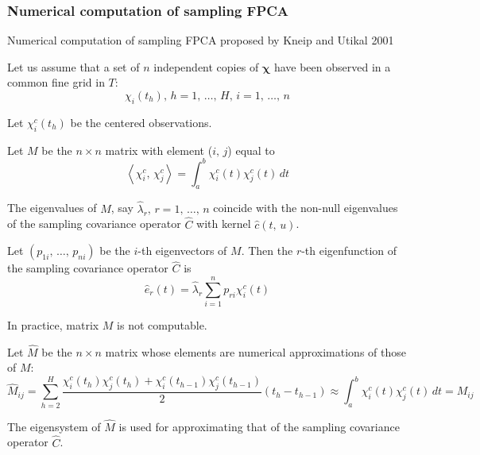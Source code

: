 \subsubsection{Numerical computation of sampling FPCA}

\begin{algorithm}{Numerical computation of sampling FPCA}{}
    proposed by Kneip and Utikal 2001

    Let us assume that a set of $n$ independent copies of $\boldsymbol \chi$ have
    been observed in a common fine grid in $T$:
    \begin{equation*}
        \chi_i(t_h),\,h=1,\, \dots,\, H,\,i=1,\, \dots,\, n
    \end{equation*}

    Let $\chi_i^c(t_h)$ be the centered observations.

    Let $M$ be the $n \times n$ matrix with element ($i,\,j$) equal to
    \begin{equation*}
        \left\langle \chi_i^c,\, \chi_j^c \right\rangle = \int_a^b \chi_i^c(t) \chi_j^c(t) \,dt
    \end{equation*}

    The eigenvalues of $M$, say $\hat\lambda_r,\,r=1,\, \dots,\, n$ coincide with
    the non-null eigenvalues of the sampling covariance operator $\hat C$ with
    kernel $\hat c(t,\,u)$.

    Let $(p_{1i},\, \dots,\, p_{ni})$ be the $i$-th eigenvectors of $M$. Then
    the $r$-th eigenfunction of the sampling covariance operator $\hat C$ is
    \begin{equation*}
        \hat e_r(t) = \hat \lambda_r \sum_{i=1}^n p_{ri} \chi_i^c(t)
    \end{equation*}

    In practice, matrix $M$ is not computable.

    Let $\hat M$ be the $n \times n$ matrix whose elements
    are numerical approximations of those of $M$:
    \begin{equation*}
        \hat M_{ij} = \sum_{h=2}^H \frac{\chi_i^c(t_h) \chi_j^c(t_h) + \chi_i^c(t_{h-1}) \chi_j^c(t_{h-1})}{2}
            (t_h - t_{h-1})
            \approx \int_a^b \chi_i^c(t) \chi_j^c(t) \,dt = M_{ij}
    \end{equation*}

    The eigensystem of $\hat M$ is used for approximating that of the sampling covariance operator $\hat C$.
\end{algorithm}

